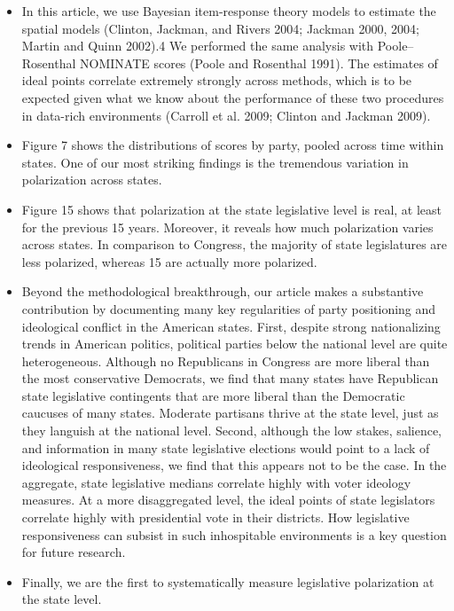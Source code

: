 \documentclass[a4paper,12pt]{article}
\begin{document}
\begin{enumerate}
\begin{itemize}
\item In this article, we use Bayesian item-response theory models to estimate the spatial models (Clinton, Jackman, and Rivers 2004; Jackman 2000, 2004; Martin and Quinn 2002).4 We performed the same analysis with Poole–Rosenthal NOMINATE scores (Poole and Rosenthal 1991). The estimates of ideal points correlate extremely strongly across methods, which is to be expected given what we know about the performance of these two procedures in data-rich environments (Carroll et al. 2009; Clinton and Jackman 2009). 
\item Figure 7 shows the distributions of scores by party, pooled across time within states. One of our most striking findings is the tremendous variation in polarization across states. 
\item Figure 15 shows that polarization at the state legislative level is real, at least for the previous 15 years. Moreover, it reveals how much polarization varies across states. In comparison to Congress, the majority of state legislatures are less polarized, whereas 15 are actually more polarized. 
\item Beyond the methodological breakthrough, our article makes a substantive contribution by documenting many key regularities of party positioning and ideological conflict in the American states. First, despite strong nationalizing trends in American politics, political parties below the national level are quite heterogeneous. Although no Republicans in Congress are more liberal than the most conservative Democrats, we find that many states have Republican state legislative contingents that are more liberal than the Democratic caucuses of many states. Moderate partisans thrive at the state level, just as they languish at the national level. Second, although the low stakes, salience, and information in many state legislative elections would point to a lack of ideological responsiveness, we find that this appears not to be the case. In the aggregate, state legislative medians correlate highly with voter ideology measures. At a more disaggregated level, the ideal points of state legislators correlate highly with presidential vote in their districts. How legislative responsiveness can subsist in such inhospitable environments is a key question for future research.  
\item Finally, we are the first to systematically measure legislative polarization at the state level. 
\end{itemize}

\newpage


\end{enumerate}
\end{document}
